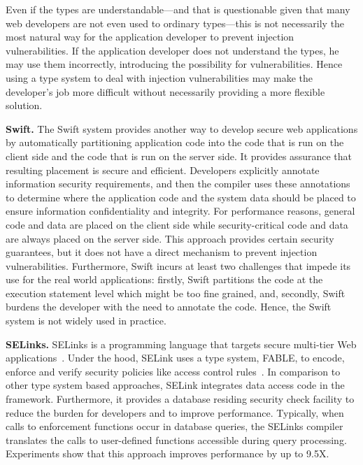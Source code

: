 Even if the types are
understandable---and that is questionable given that many web developers are not
even used to ordinary types---this is not necessarily the most
natural way for the application developer to prevent injection vulnerabilities.  If the
application developer does not understand the types, he may use them incorrectly,
introducing the possibility for vulnerabilities.  Hence using a type system to
deal with injection vulnerabilities may make the developer's job more difficult without
necessarily providing a more flexible solution.

\textbf{Swift.} The Swift system \cite{swift} provides another
way to develop secure web applications by automatically partitioning
application code into the code that is run on the client side and the code that is run on the server side.
It provides assurance that resulting placement
is secure and efficient. Developers explicitly annotate information
security requirements, and then the compiler uses these annotations to determine where the application code
and the system data should be placed to ensure information confidentiality
and integrity. For performance reasons, general code and data are placed on
the client side while security-critical code and data are always placed
on the server side. This approach provides certain security guarantees, but it does not have a direct mechanism to prevent injection vulnerabilities. Furthermore, Swift incurs at least two challenges that impede its use for the real world applications: firstly, Swift partitions the code at the execution statement level which might be too fine grained, and, secondly, Swift burdens the developer with the need to annotate the code. Hence, the Swift system is not widely used in practice.

\textbf{SELinks.} SELinks is a programming language that targets secure multi-tier Web applications~\cite{corcoran09selinks}. Under the hood, SELink uses a type system, FABLE, to encode, enforce and verify security policies like access control rules~\cite{swamy08fable}. In comparison to other type system based approaches, SELink integrates data access code in the framework. Furthermore, it provides a database residing security check facility to reduce the burden for developers and to improve performance.  Typically, when calls to enforcement
functions occur in database queries, the SELinks compiler translates the calls to user-defined functions accessible during query processing. Experiments show that this approach improves performance by up to 9.5X. 

